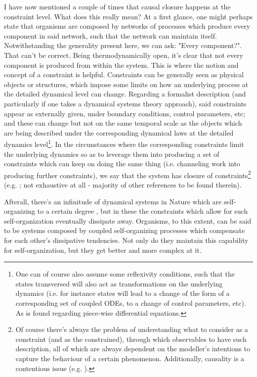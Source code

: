 \documentclass[a4paper,12pt,twoside,leqno]{article}
\begin{document}
I have now mentioned a couple of times that causal closure happens at the constraint level. What does this really mean? At a first glance, one might perhaps state that organisms are composed by networks of processes which produce every component in said network, such that the network can maintain itself. Notwithstanding the generality present here, we can ask: "Every component?". That can't be correct. Being thermodynamically open, it's clear that not every component is produced from within the system. This is where the notion and concept of a constraint is helpful. Constraints can be generally seen as physical objects or structures, which impose some limits on how an underlying process at the detailed dynamical level can change. Regarding a formalist description (and particularly if one takes a dynamical systems theory approach), said constraints appear as externally given, under boundary conditions, control parameters, etc; and these can change but not on the same temporal scale as the objects which are being described under the corresponding dynamical laws at the detailed dynamics level\footnote{One can of course also assume some reflexivity conditions, such that the states transversed will also act as transformations on the underlying dynamics (i.e. for instance states will lead to a change of the form of a corresponding set of coupled ODEs, to a change of control parameters, etc). As is found regarding piece-wise differential equations.}. In the circunstances where the corresponding constraints limit the underlying dynamics so as to leverage them into producing a set of constraints which can keep on doing the same thing (i.e. channeling work into producing further constraints), we say that the system has closure of constraints\footnote{Of course there's always the problem of understanding what to consider as a constraint (and as the constrained), through which observables to have such description, all of which are always dependent on the modeller's intentions to capture the behaviour of a certain phenomenon. Additionally, causality is a contentious issue (e.g. \cite{mossio2013emergence, craver2007top}).} (e.g. \cite{montevil2015biological, moreno2015biological, mossio2013emergence}; not exhaustive at all - majority of other references to be found therein).

Afterall, there's an infinitude of dynamical systems in Nature which are self-organizing to a certain degree \citep{glansdorff1973thermodynamic}, but in these the constraints which allow for such self-organization eventually dissipate away. Organisms, to this extent, can be said to be systems composed by coupled self-organizing processes which compensate for each other’s dissipative tendencies. Not only do they maintain this capability for self-organization, but they get better and more complex at it.
\end{document}

